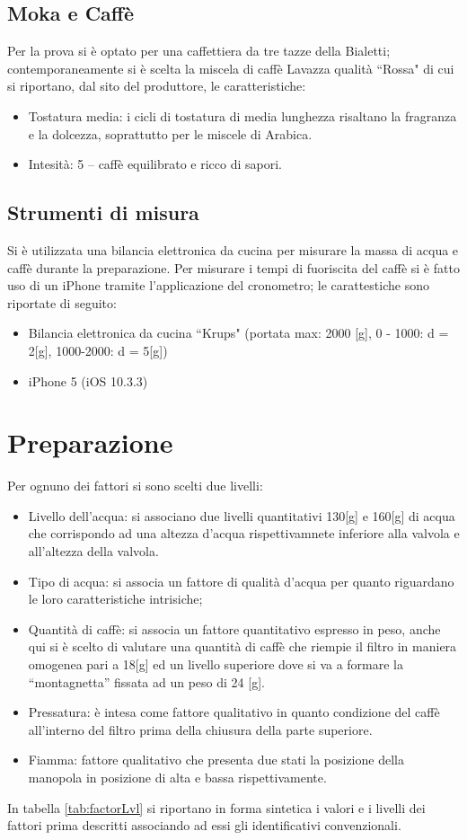 \subsection{Moka e Caffè}
Per la prova si è optato per una caffettiera da tre tazze della Bialetti; contemporaneamente si è scelta la miscela di caffè Lavazza qualità “Rossa" di cui si riportano, dal sito del produttore, le caratteristiche:
\begin{itemize}
  \item Tostatura media: i cicli di tostatura di media lunghezza risaltano la fragranza e la dolcezza, soprattutto per le miscele di Arabica.
  \item Intesità: 5 -- caffè equilibrato e ricco di sapori.
\end{itemize}
\subsection{Strumenti di misura}
Si è utilizzata una bilancia elettronica da cucina per misurare la massa di acqua e caffè durante la preparazione.
Per misurare i tempi di fuoriscita del caffè si è fatto uso di un iPhone tramite l'applicazione del cronometro; le carattestiche sono riportate di seguito:
\begin{itemize}
  \item Bilancia elettronica da cucina “Krups" (portata max: 2000 [g], 0 - 1000: d = 2[g], 1000-2000: d = 5[g])
  \item iPhone 5 (iOS 10.3.3)
\end{itemize}


\section{Preparazione}
Per ognuno dei fattori si sono scelti due livelli:
\begin{itemize}
  \item Livello dell'acqua: si associano due livelli quantitativi 130[g] e 160[g] di acqua che corrispondo ad una altezza d'acqua rispettivamnete inferiore alla valvola e all'altezza della valvola.
  \item Tipo di acqua: si associa un fattore di qualità d'acqua per quanto riguardano le loro caratteristiche intrisiche;
  \item Quantità di caffè: si associa un fattore quantitativo espresso in peso, anche qui si è scelto di valutare una quantità di caffè che riempie il filtro in maniera omogenea pari a 18[g] ed un livello superiore dove si va a formare la “montagnetta” fissata ad un peso di 24 [g].
  \item Pressatura: è intesa come fattore qualitativo in quanto condizione del caffè all'interno del filtro prima della chiusura della parte superiore.
  \item Fiamma: fattore qualitativo che presenta due stati la posizione della manopola in posizione di alta e bassa rispettivamente.
\end{itemize}
In tabella \ref{tab:factorLvl} si riportano in forma sintetica i valori e i livelli dei fattori prima descritti associando ad essi gli identificativi convenzionali.

